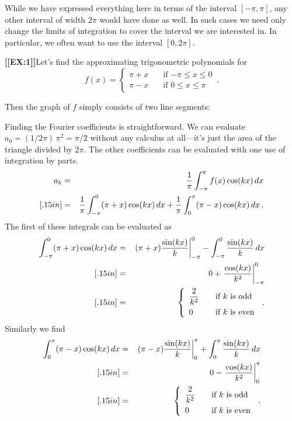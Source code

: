 {{{{While we have expressed everything here in terms of the interval $[-\pi, \pi]$, any other interval of width $2\pi$ would have done as well. In such cases we need only change the limits of integration to cover the interval we are interested in. In particular, we often want to use the interval $[0, 2\pi]$. 
 
\medskip



{\bf [[EX:1]]}\quad Let's find the approximating trigonometric polynomials for
\[
f(x) =
	\left\{ \begin{array}{ll}
				\pi+x & \quad\mbox{if $-\pi\le x\le 0$} \\
				\pi - x  & \quad\mbox{if $0\le x\le \pi$}
		\end{array}
	\right. \,.
\]
	
Then the graph of $f$ simply consists of two line segments:

\vspace*{1.5in}

Finding the Fourier coefficients is straightforward.  We can evaluate $a_0=(1/2\pi)\,\pi^2=\pi/2$ without any calculus at all---it's just the area of the triangle divided by $2\pi$.  The other coefficients can be evaluated with one use of integration by parts.
\begin{eqnarray*}
a_k&=&{1 \over \pi}\int_{-\pi}^{\pi}f(x)\cos(kx)\, dx \\ [.15in]
   &=&{1 \over \pi}\int_{-\pi}^0(\pi+x)\cos(kx)\, dx +{1 \over \pi}\int_0^{\pi}(\pi-x)\cos(kx)\, dx \,.
   \end{eqnarray*}
   The first of these integrals can be evaluated as
   \begin{eqnarray*}
 \int_{-\pi}^0(\pi+x)\cos(kx)\, dx  &=&\left.(\pi+x){\sin(kx) \over k}\right|_{-\pi}^0-\int_{-\pi}^0 {\sin(kx) \over k}\, dx \\ [.15in]
 &=&0 +\left.{\cos(kx) \over k^2}\right|_{-\pi}^0 \\ [.15in]
 &=&\left\{ \begin{array}{ll}
				{\displaystyle {2 \over k^2}} & \quad\mbox{if $k$ is odd} \\ [.1in]
				0  & \quad\mbox{if $k$ is even}
		\end{array}
	\right. \,.
   \end{eqnarray*}
Similarly we find
   \begin{eqnarray*}
 \int_0^{\pi}(\pi-x)\cos(kx)\, dx  &=&\left.(\pi-x){\sin(kx) \over k}\right|_0^{\pi}+\int_0^{\pi} {\sin(kx) \over k}\, dx \\ [.15in]
 &=&0 -\left.{\cos(kx) \over k^2}\right|_0^{\pi} \\ [.15in]
 &=&\left\{ \begin{array}{ll}
				{\displaystyle {2 \over k^2}} & \quad\mbox{if $k$ is odd} \\ [.1in]
				0  & \quad\mbox{if $k$ is even}
		\end{array}
	\right. \,.
   \end{eqnarray*}
   
}}}}
